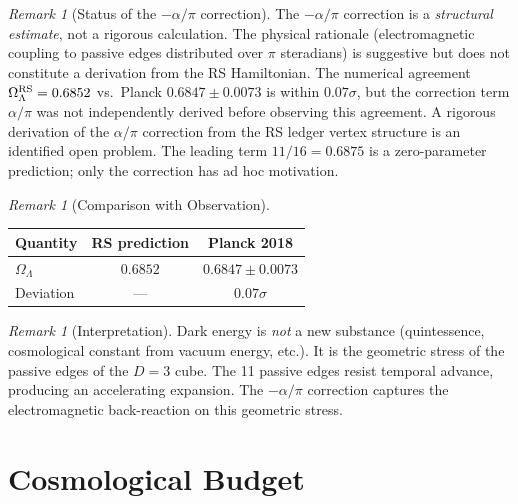 \documentclass[12pt,a4paper]{article}
\theoremstyle{definition}
\theoremstyle{remark}
\newtheorem{remark}[theorem]{Remark}
\begin{document}
\begin{remark}[Status of the $-\alpha/\pi$ correction]
\label{rem:correction-status}
The $-\alpha/\pi$ correction is a \emph{structural estimate}, not a
rigorous calculation.  The physical rationale (electromagnetic coupling
to passive edges distributed over $\pi$ steradians) is suggestive but
does not constitute a derivation from the RS Hamiltonian.  The numerical
agreement $\Omega_\Lambda^{\rm RS} = 0.6852$ vs.\ Planck $0.6847 \pm
0.0073$ is within $0.07\sigma$, but the correction term $\alpha/\pi$
was not independently derived before observing this agreement.  A
rigorous derivation of the $\alpha/\pi$ correction from the RS ledger
vertex structure is an identified open problem.  The leading term
$11/16 = 0.6875$ is a zero-parameter prediction; only the correction
has ad hoc motivation.
\end{remark}

\begin{remark}[Comparison with Observation]
\begin{center}
\renewcommand{\arraystretch}{1.3}
\begin{tabular}{@{}lcc@{}}
\toprule
\textbf{Quantity} & \textbf{RS prediction} &
\textbf{Planck 2018} \\
\midrule
$\Omega_\Lambda$ & $0.6852$ &
$0.6847 \pm 0.0073$ \\
Deviation & --- & $0.07\sigma$ \\
\bottomrule
\end{tabular}
\end{center}
\end{remark}

\begin{remark}[Interpretation]
Dark energy is \emph{not} a new substance (quintessence,
cosmological constant from vacuum energy, etc.).  It is the
geometric stress of the passive edges of the $D = 3$ cube.
The 11 passive edges resist temporal advance, producing an
accelerating expansion.  The $-\alpha/\pi$ correction
captures the electromagnetic back-reaction on this geometric
stress.
\end{remark}

\section{Cosmological Budget}
\label{sec:budget}
\end{document}
